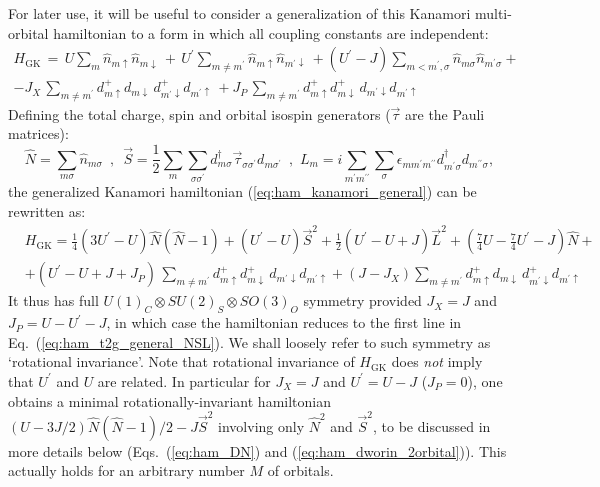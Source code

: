 \documentclass[]{ar2e-changed}%
\def\ed{\varepsilon_d}
\def\Up{U^\prime}
\def\hn{\hat{n}}
\def\hN{\hat{N}}
\def\hnmu{\hat{n}_{m\uparrow}}
\def\hnmd{\hat{n}_{m\downarrow}}
\def\hnpmd{\hat{n}_{m^\prime\downarrow}}
\def\spinup{\uparrow}
\def\spindown{\downarrow}
\def\mp{m^\prime}
\def\mpp{m^{\prime\prime}}
\def\ttg{$t_{2g}\,$}
\begin{document}
For later use, it will be useful to consider a generalization of this Kanamori multi-orbital hamiltonian to a form in which 
all coupling constants are independent:
\begin{eqnarray}
H_{\mathrm{GK}}\,=\,U\sum_m \hnmu\hnmd\,+\,U^\prime\sum_{m\neq\mp} \hnmu\hnpmd\,
+(U^\prime-J) \sum_{m<\mp,\sigma} \hn_{m\sigma}\hn_{\mp\sigma} + \nonumber \\
-J_X\,\sum_{m\neq\mp} d^+_{m\spinup}d_{m\spindown}\,d^+_{\mp\spindown}d_{\mp\spinup} \,
+ J_P\, \sum_{m\neq\mp} d^+_{m\spinup}d^+_{m\spindown}\,d_{\mp\spindown}d_{\mp\spinup} 
\label{eq:ham_kanamori_general} 
\end{eqnarray}
%
Defining the total charge, spin and orbital isospin generators ($\vec{\tau}$ are the Pauli matrices): 
\begin{equation}
\hat{N} = \sum_{m\sigma} \hn_{m\sigma}\,\,\,,\,\,\,
\vec{S} = \frac{1}{2} \sum_m \sum_{\sigma\sigma^\prime} 
d^\dagger_{m\sigma} \vec{\tau}_{\sigma\sigma^\prime}d_{m\sigma^\prime}\,\,\,,\,\,
L_m = i\sum_{\mp\mpp}\sum_\sigma\epsilon_{m\mp\mpp} d^\dagger_{\mp\sigma}d_{\mpp\sigma},
\end{equation}
%
the generalized Kanamori hamiltonian (\ref{eq:ham_kanamori_general}) can be rewritten as:
\begin{eqnarray}
&H_{\mathrm{GK}}=\frac{1}{4} (3\Up-U) \hN(\hN-1)+(\Up-U)\vec{S}^2+\frac{1}{2}(\Up-U+J)\vec{L}^2 
+(\frac{7}{4}U-\frac{7}{4}\Up - J)\hat{N} + \nonumber \\
&+(\Up-U+J+J_P)\,\sum_{m\neq\mp} d^+_{m\spinup}d^+_{m\spindown}\,d_{\mp\spindown}d_{\mp\spinup}
+(J-J_X)\sum_{m\neq\mp} d^+_{m\spinup}d_{m\spindown}\,d^+_{\mp\spindown}d_{\mp\spinup}
\label{eq:ham_t2g_general_NSL}
\end{eqnarray}
%
It thus has full $U(1)_C\otimes SU(2)_S\otimes SO(3)_O$ symmetry provided  $J_X=J$ and $J_P=U-U^\prime-J$, 
in which case the hamiltonian reduces to the first line in Eq.~(\ref{eq:ham_t2g_general_NSL}). 
%
We shall loosely refer to such symmetry as `rotational invariance'. 
Note that rotational invariance of $H_{\mathrm{GK}}$ does {\it not} imply that $\Up$ and $U$ are related. 
%
In particular for $J_X=J$ and $\Up=U-J$ ($J_P=0$), one obtains a minimal rotationally-invariant hamiltonian  
$(U-3J/2)\hN(\hN-1)/2-J\vec{S}^2$ involving only $\hN^2$ and $\vec{S}^2$, to be discussed in more details below 
(Eqs.~(\ref{eq:ham_DN}) and (\ref{eq:ham_dworin_2orbital})). This actually holds for an arbitrary number $M$ of orbitals.  
\end{document}
